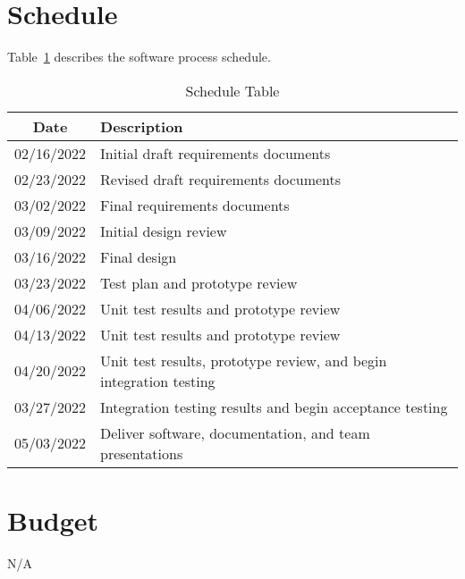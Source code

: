 \documentclass[letterpaper,12pt,oneside,listof=totoc]{scrreprt}
\begin{document}
\section{Schedule}

Table~\ref{Schedule} describes the software process schedule.

\begin{table}[h!]
\begin{tabular}{| c | p{} |}
\hline
Date     & Description    \\
\hline
02/16/2022 & Initial draft requirements documents  \\
\hline
02/23/2022 & Revised draft requirements documents  \\
\hline
03/02/2022 & Final requirements documents  \\
\hline
03/09/2022 & Initial design review  \\
\hline
03/16/2022 & Final design  \\
\hline
03/23/2022 & Test plan and prototype review  \\
\hline
04/06/2022 & Unit test results and prototype review  \\
\hline
04/13/2022 & Unit test results and prototype review  \\
\hline
04/20/2022 & Unit test results, prototype review, and begin integration testing  \\
\hline
03/27/2022 & Integration testing results and begin acceptance testing  \\
\hline
05/03/2022 & Deliver software, documentation, and team presentations  \\
\hline
\end{tabular}
\caption{Schedule Table}
\label{Schedule}
\end{table}


\section{Budget}
N/A
\end{document}
